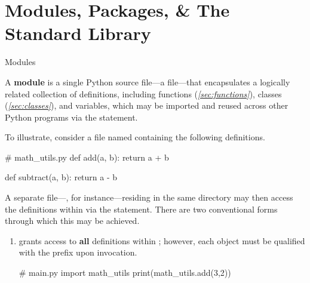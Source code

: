 \documentclass[10pt]{article}
\begin{document}


\section{Modules, Packages, \& The Standard Library}
  \label{sec:modules_packages}

  \begin{core}{Modules}

    A \textbf{module} is a single Python source file---a  file---that encapsulates a logically related collection of definitions, including functions (\textit{\autoref{sec:functions}}), classes (\textit{\autoref{sec:classes}}), and variables, which may be imported and reused across other Python programs via the  statement.

    To illustrate, consider a file named  containing the following definitions.

    \begin{pyconsole}

      # math_utils.py
      def add(a, b):
          return a + b

      def subtract(a, b):
          return a - b

    \end{pyconsole}

    A separate file---, for instance---residing in the same directory may then access the definitions within  via the  statement. There are two conventional forms through which this may be achieved.

    \begin{enumerate}

      \item {} grants access to \textbf{all} definitions within ; however, each object must be qualified with the  prefix upon invocation.

      \begin{pyconsole}

        # main.py
        import math_utils
        print(math_utils.add(3,2))

      \end{pyconsole}


\end{enumerate}
\end{core}
\end{document}
